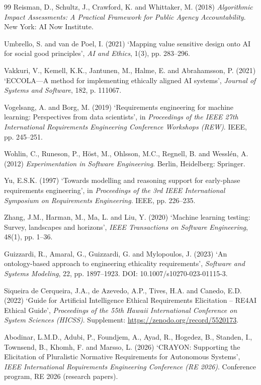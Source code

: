 \documentclass[11pt,a4paper]{article}
\begin{document}
\begin{thebibliography}{99}
Reisman, D., Schultz, J., Crawford, K. and Whittaker, M. (2018) \textit{Algorithmic Impact Assessments: A Practical Framework for Public Agency Accountability}. New York: AI Now Institute.

Umbrello, S. and van de Poel, I. (2021) `Mapping value sensitive design onto AI for social good principles', \textit{AI and Ethics}, 1(3), pp. 283--296.

Vakkuri, V., Kemell, K.K., Jantunen, M., Halme, E. and Abrahamsson, P. (2021) `ECCOLA---A method for implementing ethically aligned AI systems', \textit{Journal of Systems and Software}, 182, p. 111067.

Vogelsang, A. and Borg, M. (2019) `Requirements engineering for machine learning: Perspectives from data scientists', in \textit{Proceedings of the IEEE 27th International Requirements Engineering Conference Workshops (REW)}. IEEE, pp. 245--251.

Wohlin, C., Runeson, P., H\"{o}st, M., Ohlsson, M.C., Regnell, B. and Wessl\'{e}n, A. (2012) \textit{Experimentation in Software Engineering}. Berlin, Heidelberg: Springer.

Yu, E.S.K. (1997) `Towards modelling and reasoning support for early-phase requirements engineering', in \textit{Proceedings of the 3rd IEEE International Symposium on Requirements Engineering}. IEEE, pp. 226--235.

Zhang, J.M., Harman, M., Ma, L. and Liu, Y. (2020) `Machine learning testing: Survey, landscapes and horizons', \textit{IEEE Transactions on Software Engineering}, 48(1), pp. 1--36.

Guizzardi, R., Amaral, G., Guizzardi, G. and Mylopoulos, J. (2023) `An ontology-based approach to engineering ethicality requirements', \textit{Software and Systems Modeling}, 22, pp. 1897--1923. DOI: 10.1007/s10270-023-01115-3.

Siqueira de Cerqueira, J.A., de Azevedo, A.P., Tives, H.A. and Canedo, E.D. (2022) `Guide for Artificial Intelligence Ethical Requirements Elicitation -- RE4AI Ethical Guide', \textit{Proceedings of the 55th Hawaii International Conference on System Sciences (HICSS)}. Supplement: \url{https://zenodo.org/record/5520173}.

Abodinar, L.M.D., Adubi, P., Foundjem, A., Ayad, R., Hogedez, B., Standen, I., Townsend, B., Khomh, F. and Marsso, L. (2026) `CRAYON: Supporting the Elicitation of Pluralistic Normative Requirements for Autonomous Systems', \textit{IEEE International Requirements Engineering Conference (RE 2026)}. Conference program, RE 2026 (research papers).


\end{thebibliography}
\end{document}
